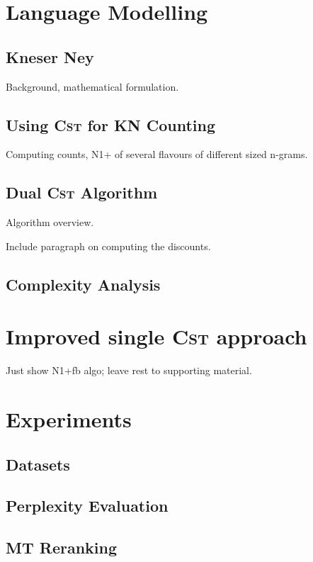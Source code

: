 \documentclass[11pt,a4paper]{article}
\newcommand*\CST{\textsc{Cst}\xspace}
\begin{document}
\section{Language Modelling}

\subsection{Kneser Ney}

Background, mathematical formulation.

\subsection{Using \CST for KN Counting}

Computing counts, N1+ of several flavours of different sized n-grams.

\subsection{Dual \CST Algorithm} 

Algorithm overview.

Include paragraph on computing the discounts.

\subsection{Complexity Analysis}

\section{Improved single \CST approach}

Just show N1+fb algo; leave rest to supporting material.

\section{Experiments}

\subsection{Datasets}

\subsection{Perplexity Evaluation}

\subsection{MT Reranking}
\end{document}
